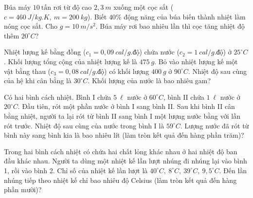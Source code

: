 \begin{ex}%
{}
\loigiai{}
\end{ex}

\begin{ex}%
Búa máy $10\ \text{tấn}$ rơi từ độ cao $2,3\ m$ xuống một cọc sắt ($c=460\ J/kg.K,\ m=200\ kg$). Biết $40\%$ động năng của búa biến thành nhiệt làm nóng cọc sắt. Cho $g=10\ m/s^2$. Búa máy rơi bao nhiêu lần thì cọc tăng nhiệt độ thêm $20^\circ C$?
\loigiai{}
\end{ex}

\begin{ex}%
Nhiệt lượng kế bằng đồng ($c_1=0,09\ cal/g.\text{độ}$) chứa nước ($c_2=1\ cal/g.\text{độ}$) ở $25^\circ C$. Khối lượng tổng cộng của nhiệt lượng kế là $475\ g$. Bỏ vào nhiệt lượng kế một vật bằng thau ($c_3=0,08\ cal/g.\text{độ}$) có khối lượng $400\ g$ ở $90^\circ C$. Nhiệt độ sau cùng của hệ khi cân bằng là $30^\circ C$. Khối lượng của nước là bao nhiêu gam?
\loigiai{}
\end{ex}

\begin{ex}%
Có hai bình cách nhiệt. Bình I chứa $5\ \ell$ nước ở $60^\circ C$, bình II chứa $1\ \ell$ nước ở $20^\circ C$. Đầu tiên, rót một phần nước ở bình I sang bình II. Sau khi bình II cân bằng nhiệt, người ta lại rót từ bình II sang bình I một lượng nước bằng với lần rót trước. Nhiệt độ sau cùng của nước trong bình I là $59^\circ C$. Lượng nước đã rót từ bình này sang bình kia là bao nhiêu lít (làm tròn kết quả đến hàng phần trăm)?
\loigiai{}
\end{ex}

\begin{ex}%
Trong hai bình cách nhiệt có chứa hai chất lỏng khác nhau ở hai nhiệt độ ban đầu khác nhau. Người ta dùng một nhiệt kế lần lượt nhúng đi nhúng lại vào bình 1, rồi vào bình 2. Chỉ số của nhiệt kế lần lượt là $40^\circ C,\ 8^\circ C,\ 39^\circ C,\ 9,5^\circ C$. Đến lần nhúng tiếp theo nhiệt kế chỉ bao nhiêu độ Celsius (làm tròn kết quả đến hàng phần mười)?
\loigiai{}
\end{ex}


